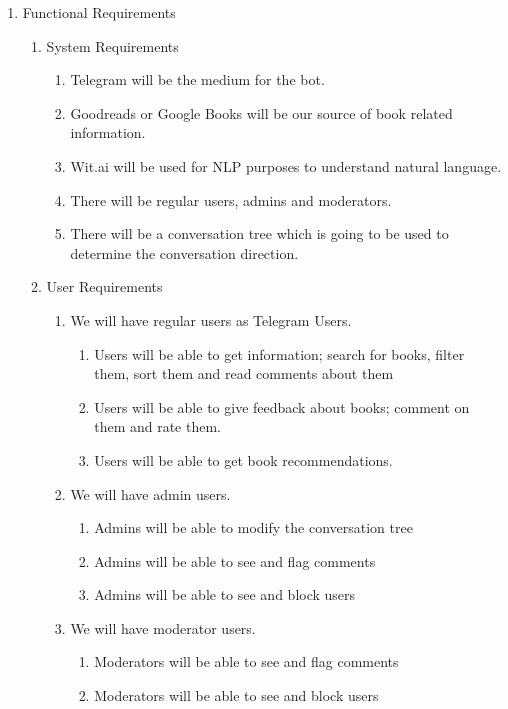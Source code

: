 \documentclass[a4paper]{article}
\begin{document}
\begin{enumerate}
\item Functional Requirements
  \begin{enumerate}
  \item System Requirements
    \begin{enumerate}
    \item Telegram will be the medium for the bot.
    \item Goodreads or Google Books will be our source of book related information.
    \item Wit.ai will be used for NLP purposes to understand natural language.
    \item There will be regular users, admins and moderators.
    \item There will be a conversation tree which is going to be used to determine the conversation direction.
    \end{enumerate}
  \item User Requirements
    \begin{enumerate}
    \item We will have regular users as Telegram Users.
      \begin{enumerate}
        \item Users will be able to get information; search for books, filter them, sort them and read comments about them
        \item Users will be able to give feedback about books; comment on them and rate them.
        \item Users will be able to get book recommendations.
        \end{enumerate}
    \item We will have admin users.
        \begin{enumerate}
        \item Admins will be able to modify the conversation tree
        \item Admins will be able to see and flag comments
        \item Admins will be able to see and block users
        \end{enumerate}
    \item We will have moderator users.
        \begin{enumerate}
        \item Moderators will be able to see and flag comments
        \item Moderators will be able to see and block users
        \end{enumerate}

\end{enumerate}
\end{enumerate}
\end{enumerate}
\end{document}
